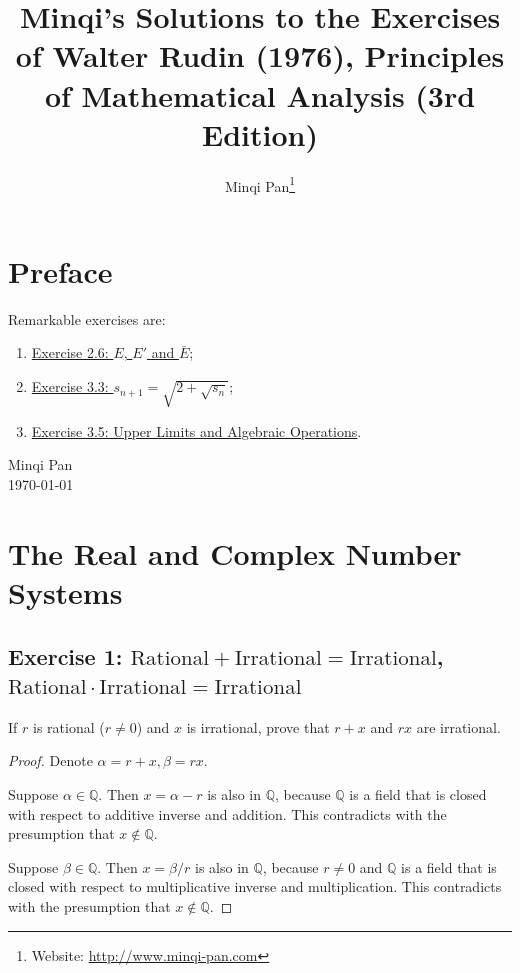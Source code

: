 \documentclass{amsbook}
\theoremstyle{definition}
\theoremstyle{remark}
\numberwithin{section}{chapter}
\numberwithin{equation}{chapter}
\begin{document}
\frontmatter

\title{Minqi's Solutions to the Exercises of Walter Rudin (1976), Principles of Mathematical Analysis (3rd Edition)}

\author{Minqi Pan\footnote{Website: \href{http://www.minqi-pan.com}{http://www.minqi-pan.com}}}

\maketitle

\setcounter{page}{4}

\tableofcontents

\chapter*{Preface}

Remarkable exercises are:
\begin{enumerate}
\item\hyperref[Exercise 2.6]{Exercise 2.6: $E$, $E'$ and $\bar E$};
\item\hyperref[Exercise 3.3]{Exercise 3.3: $s_{n+1}=\sqrt{2+\sqrt{s_n}}$};
\item\hyperref[Exercise 3.5]{Exercise 3.5: Upper Limits and Algebraic Operations}.
\end{enumerate}

\medskip
\begin{flushright}
Minqi Pan\\
\today
\end{flushright}

\mainmatter

\chapter{The Real and Complex Number Systems}

\section{Exercise 1: $\text{Rational}+\text{Irrational}=\text{Irrational}$, $\text{Rational}\cdot\text{Irrational}=\text{Irrational}$}

If $r$ is rational ($r\ne 0$) and $x$ is irrational, prove that $r+x$ and $rx$ are irrational.

\begin{proof}
Denote $\alpha=r+x, \beta=rx$.

Suppose $\alpha\in\mathbb{Q}$. Then $x=\alpha-r$ is also in $\mathbb{Q}$, because $\mathbb{Q}$ is a field that is closed with respect to additive inverse and addition. This contradicts with the presumption that $x\notin\mathbb{Q}$.

Suppose $\beta\in\mathbb{Q}$. Then $x=\beta/r$ is also in $\mathbb{Q}$, because $r\ne 0$ and $\mathbb{Q}$ is a field that is closed with respect to multiplicative inverse and multiplication. This contradicts with the presumption that $x\notin\mathbb{Q}$.
\end{proof}
\end{document}
